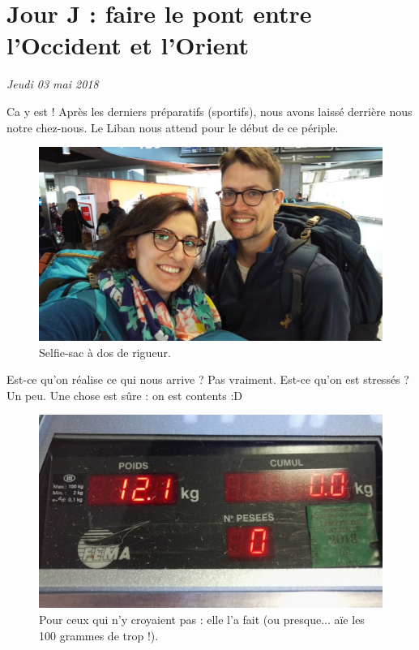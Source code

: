\hypertarget{jour-j-faire-le-pont-entre-loccident-et-lorient}{%
\section{Jour J : faire le pont entre l'Occident et
l'Orient}\label{jour-j-faire-le-pont-entre-loccident-et-lorient}}

\emph{Jeudi 03 mai 2018}

Ca y est ! Après les derniers préparatifs (sportifs), nous avons laissé
derrière nous notre chez-nous. Le Liban nous attend pour le début de ce
périple.

\begin{figure}
\centering
\includegraphics{images/20180503_depart.jpg}
\caption{Selfie-sac à dos de rigueur.}
\end{figure}

Est-ce qu'on réalise ce qui nous arrive ? Pas vraiment. Est-ce qu'on est
stressés ? Un peu. Une chose est sûre : on est contents :D

\begin{figure}
\centering
\includegraphics{images/20180503_Elida_sac.jpg}
\caption{Pour ceux qui n'y croyaient pas : elle l'a fait (ou presque...
aïe les 100 grammes de trop !).}
\end{figure}


